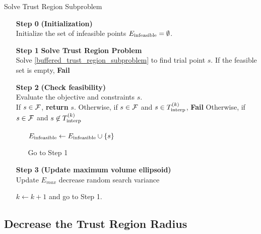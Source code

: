 \begin{algorithm}[H]
    \caption{Solve Trust Region Subproblem}
    \label{linear_cut_trust_region_subproblem}
    \begin{itemize}
        \item[\textbf{Step 0}] \textbf{(Initialization)} \\
	    Initialize the set of infeasible points ${E_\textrm{infeasible}} = \emptyset$.
        
        \item[\textbf{Step 1}] \textbf{Solve Trust Region Problem} \\
	    Solve \cref{buffered_trust_region_subproblem} to find trial point $s$.
	    If the feasible set is empty, \textbf{Fail}
        
        \item[\textbf{Step 2}] \textbf{(Check feasibility)} \\
            Evaluate the objective and constraints $s$. \\
            If $s\in{\mathcal F}$, \textbf{return} $s$.
            Otherwise, if $s\in{\mathcal F}$ and $s \in {T_{\text{interp}}^{(k)}}$, \textbf{Fail}
	    Otherwise, if $s\in{\mathcal F}$ and $s \not \in {T_{\text{interp}}^{(k)}}$ \begin{itemize}
	    	\item[] ${E_\textrm{infeasible}} \gets {E_\textrm{infeasible}} \cup \{s\}$
	    	\item[] Go to Step 1
	    \end{itemize}
            
        \item[\textbf{Step 3}] \textbf{(Update maximum volume ellipsoid)} \\
	    Update $E_{max}$
	    decrease random search variance
            
        $k \gets k+1$ and go to Step 1.
    \end{itemize}
\end{algorithm}




\subsection{Decrease the Trust Region Radius}
\label{decreasing_the_trust_region_for_infeasible_trial}

